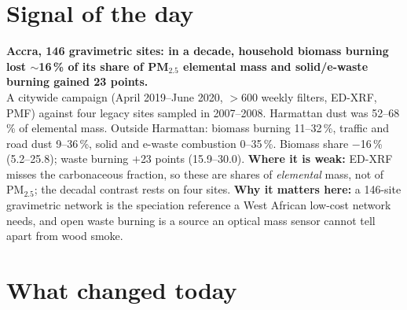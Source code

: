 \documentclass[10pt]{article}
\begin{document}
\vspace{6mm}

\section*{\sffamily\bfseries\color{Deep}Signal of the day}
\vspace{-1.5mm}{\color{Amber}\rule{\linewidth}{1.1pt}}\vspace{2.5mm}

\begin{keybox}
{\sffamily\bfseries\small\color{Deep}Accra, 146 gravimetric sites: in a decade, household biomass burning
lost $\sim$16\,\% of its share of PM$_{2.5}$ elemental mass and solid/e-waste burning gained 23 points.}\\[1.4mm]
\footnotesize
A citywide campaign (April 2019--June 2020, $>$600 weekly filters, ED-XRF, PMF) against four legacy sites sampled in
2007--2008. Harmattan dust was 52--68\,\% of elemental mass. Outside Harmattan: biomass burning 11--32\,\%, traffic and
road dust 9--36\,\%, solid and e-waste combustion 0--35\,\%. Biomass share $-$16\,\% (5.2--25.8); waste burning
$+$23 points (15.9--30.0).
\textbf{Where it is weak:} ED-XRF misses the carbonaceous fraction, so these are shares of \emph{elemental} mass, not of
PM$_{2.5}$; the decadal contrast rests on four sites.
\textbf{Why it matters here:} a 146-site gravimetric network is the speciation reference a West African low-cost
network needs, and open waste burning is a source an optical mass sensor cannot tell apart from wood smoke.\par
\end{keybox}

\vspace{3mm}

\section*{\sffamily\bfseries\color{Deep}What changed today}
\vspace{-1.5mm}{\color{Amber}\rule{\linewidth}{1.1pt}}\vspace{2.5mm}
\end{document}
